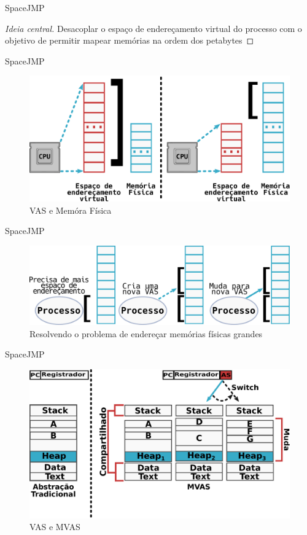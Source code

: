 \documentclass[xcolor={usenames,svgnames,dvipsnames},brazil,english,12pt,aspectratio=149]{beamer}
\begin{document}
\begin{frame}{SpaceJMP}

  \begin{proof}[Ideia central]
Desacoplar o espaço de endereçamento virtual do processo com o objetivo de
permitir mapear memórias na ordem dos petabytes
  \end{proof}

\end{frame}

\begin{frame}{SpaceJMP}
  \begin{figure}[!h]
    \centering
    \includegraphics[width=.7\textwidth]{vas_vs_physical_address} 
    \caption*{VAS e Memóra Física}
  \end{figure}
\end{frame}

\begin{frame}{SpaceJMP}
  \begin{figure}[!h]
    \centering
    \includegraphics[width=.7\textwidth]{solve_huge_address_memory}
    \caption*{Resolvendo o problema de endereçar memórias físicas grandes}
  \end{figure}
\end{frame}

\begin{frame}{SpaceJMP}
  \begin{figure}[!h]
    \centering
    \includegraphics[width=.7\textwidth]{traditional_vs_mvas} 
    \caption*{VAS e MVAS}
  \end{figure}
\end{frame}
\end{document}
